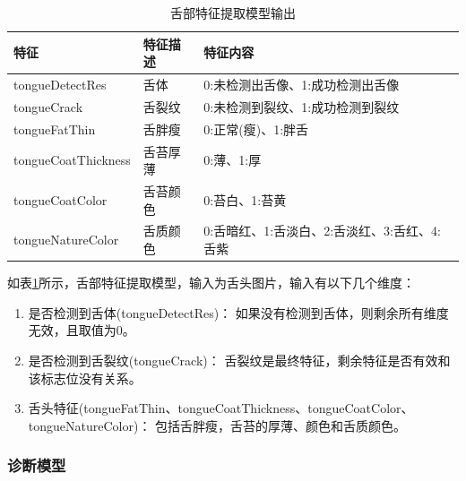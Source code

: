 \begin{table}[h]
    \centering
    \caption{舌部特征提取模型输出}
    \begin{tabular}{lll}
        \toprule
        特征 & 特征描述 & 特征内容 \\ 
        \midrule
        tongueDetectRes & 舌体 & 0:未检测出舌像、1:成功检测出舌像 \\
        tongueCrack & 舌裂纹 & 0:未检测到裂纹、1:成功检测到裂纹 \\ 
        tongueFatThin & 舌胖瘦 & 0:正常(瘦)、1:胖舌 \\
        tongueCoatThickness & 舌苔厚薄 & 0:薄、1:厚 \\
        tongueCoatColor & 舌苔颜色 & 0:苔白、1:苔黄 \\
        tongueNatureColor & 舌质颜色 & 0:舌暗红、1:舌淡白、2:舌淡红、3:舌红、4:舌紫\\
        \bottomrule
    \end{tabular}
    \label{tab:tongue-feature}
\end{table}

如表\ref{tab:tongue-feature}所示，舌部特征提取模型，输入为舌头图片，输入有以下几个维度：
\begin{enumerate}
    \item 是否检测到舌体(tongueDetectRes)： 如果没有检测到舌体，则剩余所有维度无效，且取值为0。

    \item 是否检测到舌裂纹(tongueCrack)： 舌裂纹是最终特征，剩余特征是否有效和该标志位没有关系。

    \item 舌头特征(tongueFatThin、tongueCoatThickness、tongueCoatColor、tongueNatureColor)： 包括舌胖瘦，舌苔的厚薄、颜色和舌质颜色。

\end{enumerate}

\subsubsection{诊断模型}


